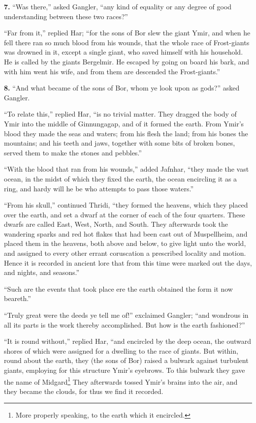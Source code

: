 
\textbf{7.} ``Was there,'' asked Gangler, ``any kind of equality or any degree
of good understanding between these two races?''

``Far from it,'' replied Har; ``for the sons of Bor slew the giant Ymir,
and when he fell there ran so much blood from his wounds, that the
whole race of Frost-giants was drowned in it, except a single giant,
who saved himself with his household. He is called by the giants
Bergelmir. He escaped by going on board his bark, and with him went
his wife, and from them are descended the Frost-giants.''

\textbf{8.} ``And what became of the sons of Bor, whom ye look upon as gods?''
asked Gangler.

``To relate this,'' replied Har, ``is no trivial matter. They dragged the
body of Ymir into the middle of Ginnungagap, and of it formed the
earth. From Ymir's blood they made the seas and waters; from his flesh
the land; from his bones the mountains; and his teeth and jaws,
together with some bits of broken bones, served them to make the
stones and pebbles.''

``With the blood that ran from his wounds,'' added Jafnhar, ``they made
the vast ocean, in the midst of which they fixed the earth, the ocean
encircling it as a ring, and hardy will he be who attempts to pass
those waters.''

``From his skull,'' continued Thridi, ``they formed the heavens, which
they placed over the earth, and set a dwarf at the corner of each of
the four quarters. These dwarfs are called East, West, North, and
South. They afterwards took the wandering sparks and red hot flakes
that had been cast out of Muspellheim, and placed them in the heavens,
both above and below, to give light unto the world, and assigned to
every other errant coruscation a prescribed locality and motion. Hence
it is recorded in ancient lore that from this time were marked out the
days, and nights, and seasons.''

``Such are the events that took place ere the earth obtained the form
it now beareth.''

``Truly great were the deeds ye tell me of!'' exclaimed Gangler; ``and
wondrous in all its parts is the work thereby accomplished. But how is
the earth fashioned?''

``It is round without,'' replied Har, ``and encircled by the deep ocean,
the outward shores of which were assigned for a dwelling to the race
of giants. But within, round about the earth, they (the sons of Bor)
raised a bulwark against turbulent giants, employing for this
structure Ymir's eyebrows. To this bulwark they gave the name of
Midgard\footnote{More properly speaking, to the earth which it
encircled.} They afterwards tossed Ymir's brains into the air, and
they became the clouds, for thus we find it recorded.

